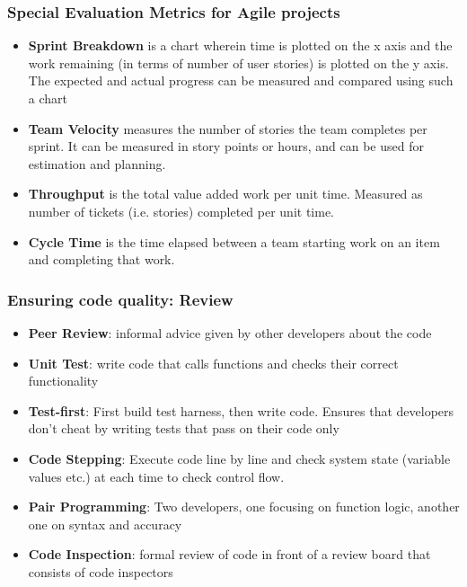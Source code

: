 \documentclass{article}
\begin{document}
 \subsubsection{Special Evaluation Metrics for Agile projects}
 \begin{itemize}
     \item \textbf{Sprint Breakdown} is a chart wherein time is plotted on the x axis and the work remaining (in terms of number of user stories) is plotted on the y axis. The expected and actual progress can be measured and compared using such a chart 
     
     \item \textbf{Team Velocity} measures the number of stories the team completes per sprint. It can be measured in story points or hours, and can be used for estimation and planning.
     
     \item \textbf{Throughput} is the total value added work per unit time. Measured as number of tickets (i.e. stories) completed per unit time. 
     
     \item \textbf{Cycle Time} is the time elapsed between a team starting work on an item and completing that work. 
 \end{itemize}


\subsubsection{Ensuring code quality: Review}
\begin{itemize}
    \item \textbf{Peer Review}: informal advice given by other developers about the code
    
    \item \textbf{Unit Test}: write code that calls functions and checks their correct functionality
    
    \item \textbf{Test-first}: First build test harness, then write code. Ensures that developers don't cheat by writing tests that pass on their code only
    
    \item \textbf{Code Stepping}: Execute code line by line and check system state (variable values etc.) at each time to check control flow.
    
    \item \textbf{Pair Programming}: Two developers, one focusing on function logic, another one on syntax and accuracy
    
    \item \textbf{Code Inspection}: formal review of code in front of a review board that consists of code inspectors
\end{itemize}
\end{document}
